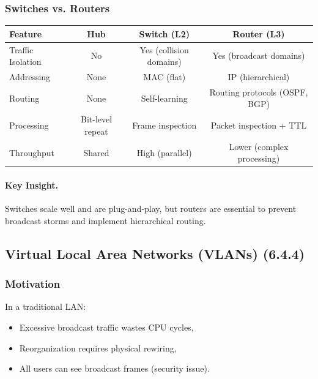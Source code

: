 \documentclass[12pt]{article}
\begin{document}
\subsubsection{Switches vs. Routers}

\begin{center}
    \begin{tabular}{|l|c|c|c|}
        \hline
        \textbf{Feature}  & \textbf{Hub}     & \textbf{Switch (L2)}    & \textbf{Router (L3)}          \\
        \hline
        Traffic Isolation & No               & Yes (collision domains) & Yes (broadcast domains)       \\
        Addressing        & None             & MAC (flat)              & IP (hierarchical)             \\
        Routing           & None             & Self-learning           & Routing protocols (OSPF, BGP) \\
        Processing        & Bit-level repeat & Frame inspection        & Packet inspection + TTL       \\
        Throughput        & Shared           & High (parallel)         & Lower (complex processing)    \\
        \hline
    \end{tabular}
\end{center}

\paragraph{Key Insight.}
Switches scale well and are plug-and-play, but routers are essential to prevent broadcast storms and implement hierarchical routing.

\subsection{Virtual Local Area Networks (VLANs) (6.4.4)}

\subsubsection{Motivation}

In a traditional LAN:
\begin{itemize}
    \item Excessive broadcast traffic wastes CPU cycles,
    \item Reorganization requires physical rewiring,
    \item All users can see broadcast frames (security issue).
\end{itemize}
\end{document}
